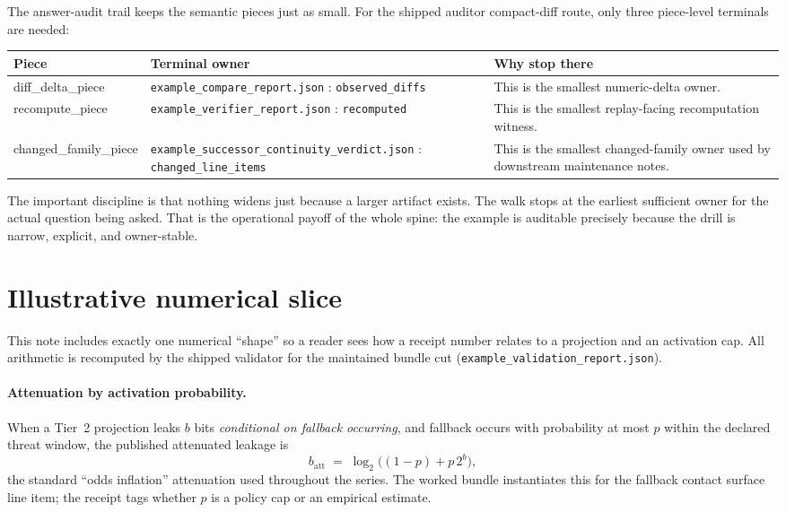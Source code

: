 \documentclass[11pt]{article}
\begin{document}
The answer-audit trail keeps the semantic pieces just as small.
For the shipped auditor compact-diff route, only three piece-level terminals are needed:
\begin{center}
\small
\begin{tabularx}{0.97\linewidth}{@{}l l X@{}}
\toprule
Piece & Terminal owner & Why stop there \\
\midrule
diff\_delta\_piece & \texttt{example\_compare\_report.json} : \texttt{observed\_diffs} & This is the smallest numeric-delta owner. \\
recompute\_piece & \texttt{example\_verifier\_report.json} : \texttt{recomputed} & This is the smallest replay-facing recomputation witness. \\
changed\_family\_piece & \texttt{example\_successor\_continuity\_verdict.json} : \texttt{changed\_line\_items} & This is the smallest changed-family owner used by downstream maintenance notes. \\
\bottomrule
\end{tabularx}
\end{center}
\vspace{-0.5em}

\noindent The important discipline is that nothing widens just because a larger artifact exists.
The walk stops at the earliest sufficient owner for the actual question being asked.
That is the operational payoff of the whole spine: the example is auditable precisely because the drill is narrow, explicit, and owner-stable.

\section{Illustrative numerical slice}
\label{sec:numerical}
This note includes exactly one numerical ``shape'' so a reader sees how a receipt number relates to a projection and an activation cap.
All arithmetic is recomputed by the shipped validator for the maintained bundle cut (\texttt{example\_validation\_report.json}).\cite{series:auditorreplay}

\paragraph{Attenuation by activation probability.}
When a Tier~2 projection leaks $b$ bits \emph{conditional on fallback occurring}, and fallback occurs with probability at most $p$ within the declared threat window, the published attenuated leakage is
\[
b_{\mathrm{att}} \;=\; \log_2\!\big((1-p) + p\,2^b\big),
\]
the standard ``odds inflation'' attenuation used throughout the series.\cite{series:oddsinflation,series:obsatten}
The worked bundle instantiates this for the fallback contact surface line item; the receipt tags whether $p$ is a policy cap or an empirical estimate.
\end{document}
